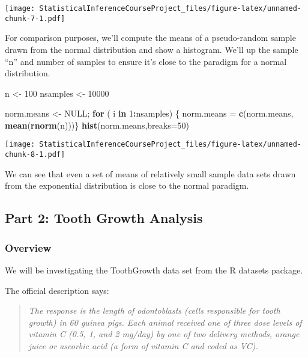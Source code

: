 \documentclass[]{article}
\newenvironment{Shaded}{\begin{snugshade}}{\end{snugshade}}
\newcommand{\KeywordTok}[1]{\textcolor[rgb]{0.13,0.29,0.53}{\textbf{#1}}}
\newcommand{\DataTypeTok}[1]{\textcolor[rgb]{0.13,0.29,0.53}{#1}}
\newcommand{\DecValTok}[1]{\textcolor[rgb]{0.00,0.00,0.81}{#1}}
\newcommand{\StringTok}[1]{\textcolor[rgb]{0.31,0.60,0.02}{#1}}
\newcommand{\OtherTok}[1]{\textcolor[rgb]{0.56,0.35,0.01}{#1}}
\newcommand{\ControlFlowTok}[1]{\textcolor[rgb]{0.13,0.29,0.53}{\textbf{#1}}}
\newcommand{\OperatorTok}[1]{\textcolor[rgb]{0.81,0.36,0.00}{\textbf{#1}}}
\newcommand{\NormalTok}[1]{#1}
\begin{document}
\texttt{[image: StatisticalInferenceCourseProject\_files/figure-latex/unnamed-chunk-7-1.pdf]}

For comparison purposes, we'll compute the means of a pseudo-random
sample drawn from the normal distribution and show a histogram. We'll up
the sample ``n'' and number of samples to ensure it's close to the
paradigm for a normal distribution.

\begin{Shaded}
\begin{Highlighting}[]
\NormalTok{n <-}\StringTok{ }\DecValTok{100}
\NormalTok{nsamples <-}\StringTok{ }\DecValTok{10000}

\NormalTok{norm.means <-}\StringTok{ }\OtherTok{NULL}\NormalTok{; }\ControlFlowTok{for}\NormalTok{ ( i }\ControlFlowTok{in} \DecValTok{1}\OperatorTok{:}\NormalTok{nsamples) \{ norm.means =}\StringTok{ }\KeywordTok{c}\NormalTok{(norm.means, }\KeywordTok{mean}\NormalTok{(}\KeywordTok{rnorm}\NormalTok{(n)))\}}
\KeywordTok{hist}\NormalTok{(norm.means,}\DataTypeTok{breaks=}\DecValTok{50}\NormalTok{)}
\end{Highlighting}
\end{Shaded}

\texttt{[image: StatisticalInferenceCourseProject\_files/figure-latex/unnamed-chunk-8-1.pdf]}

We can see that even a set of means of relatively small sample data sets
drawn from the exponential distribution is close to the normal paradigm.

\subsection{Part 2: Tooth Growth
Analysis}\label{part-2-tooth-growth-analysis}

\subsubsection{Overview}\label{overview-1}

We will be investigating the ToothGrowth data set from the R datasets
package.

The official description says:

\begin{quote}
\emph{The response is the length of odontoblasts (cells responsible for
tooth growth) in 60 guinea pigs. Each animal received one of three dose
levels of vitamin C (0.5, 1, and 2 mg/day) by one of two delivery
methods, orange juice or ascorbic acid (a form of vitamin C and coded as
VC).}
\end{quote}
\end{document}

